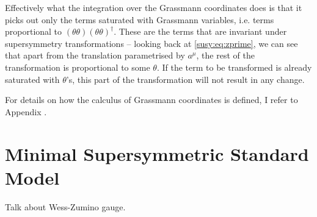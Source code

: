 \documentclass[../main.tex]{subfiles}
\begin{document}
Effectively what the integration over the Grassmann coordinates does is that it picks out only the terms saturated with Grassmann variables, i.e. terms proportional to \((\theta\theta)(\theta\theta)^\dagger\).
These are the terms that are invariant under supersymmetry transformations -- looking back at \cref{susy:eq:zprime}, we can see that apart from the translation parametrised by \(a^\mu\), the rest of the transformation is proportional to some \(\theta\).
If the term to be transformed is already saturated with \(\theta\)'s, this part of the transformation will not result in any change.

For details on how the calculus of Grassmann coordinates is defined, I refer to Appendix \needcite.
\\





\section{Minimal Supersymmetric Standard Model}

\begin{TODO}
  \item Talk about Wess-Zumino gauge.
\end{TODO}
\end{document}
